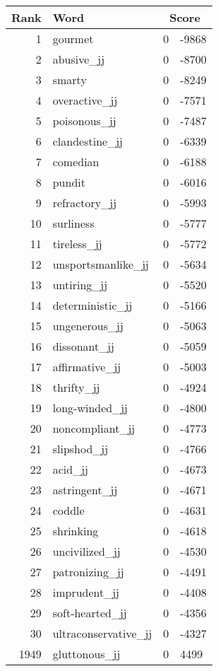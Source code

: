 \begin{longtable}[!htbp]{| rlr@{.}l |}
    \hline
    \textbf{Rank} & \textbf{Word} & \multicolumn{2}{c|}{\textbf{Score}} \\
    \hline
    \endhead
    1 & gourmet & 0 & -9868 \\
    2 & abusive\_jj & 0 & -8700 \\
    3 & smarty & 0 & -8249 \\
    4 & overactive\_jj & 0 & -7571 \\
    5 & poisonous\_jj & 0 & -7487 \\
    6 & clandestine\_jj & 0 & -6339 \\
    7 & comedian & 0 & -6188 \\
    8 & pundit & 0 & -6016 \\
    9 & refractory\_jj & 0 & -5993 \\
    10 & surliness & 0 & -5777 \\
    11 & tireless\_jj & 0 & -5772 \\
    12 & unsportsmanlike\_jj & 0 & -5634 \\
    13 & untiring\_jj & 0 & -5520 \\
    14 & deterministic\_jj & 0 & -5166 \\
    15 & ungenerous\_jj & 0 & -5063 \\
    16 & dissonant\_jj & 0 & -5059 \\
    17 & affirmative\_jj & 0 & -5003 \\
    18 & thrifty\_jj & 0 & -4924 \\
    19 & long-winded\_jj & 0 & -4800 \\
    20 & noncompliant\_jj & 0 & -4773 \\
    21 & slipshod\_jj & 0 & -4766 \\
    22 & acid\_jj & 0 & -4673 \\
    23 & astringent\_jj & 0 & -4671 \\
    24 & coddle & 0 & -4631 \\
    25 & shrinking & 0 & -4618 \\
    26 & uncivilized\_jj & 0 & -4530 \\
    27 & patronizing\_jj & 0 & -4491 \\
    28 & imprudent\_jj & 0 & -4408 \\
    29 & soft-hearted\_jj & 0 & -4356 \\
    30 & ultraconservative\_jj & 0 & -4327 \\
    1949 & gluttonous\_jj & 0 & 4499 \\

\end{longtable}
